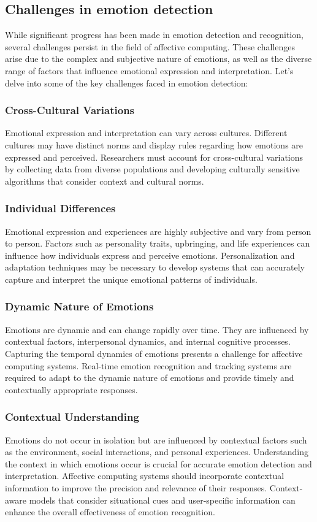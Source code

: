 \subsection{Challenges in emotion detection}
While significant progress has been made in emotion detection and recognition, several challenges persist in the field of affective computing.
These challenges arise due to the complex and subjective nature of emotions, as well as the diverse range of factors that influence emotional expression and interpretation. 
Let's delve into some of the key challenges faced in emotion detection:
\subsubsection{Cross-Cultural Variations}
Emotional expression and interpretation can vary across cultures. 
Different cultures may have distinct norms and display rules regarding how emotions are expressed and perceived. 
Researchers must account for cross-cultural variations by collecting data from diverse populations and developing culturally 
sensitive algorithms that consider context and cultural norms.
\subsubsection{Individual Differences}
Emotional expression and experiences are highly subjective and vary from person to person. 
Factors such as personality traits, upbringing, and life experiences can influence how individuals express and perceive emotions.
Personalization and adaptation techniques may be necessary to develop systems that can accurately capture and interpret the unique emotional patterns of individuals.
\subsubsection{Dynamic Nature of Emotions}
Emotions are dynamic and can change rapidly over time. They are influenced by contextual factors, interpersonal dynamics, and internal cognitive processes. Capturing the temporal dynamics of emotions presents a challenge for affective computing systems. 
Real-time emotion recognition and tracking systems are required to adapt to the dynamic nature of emotions and provide timely and contextually appropriate responses.
\subsubsection{Contextual Understanding}
Emotions do not occur in isolation but are influenced by contextual factors such as the environment, social interactions, and personal experiences. Understanding the context in which emotions occur is crucial for accurate emotion detection and interpretation. Affective computing systems should incorporate contextual information to improve the precision and relevance of their responses. 
Context-aware models that consider situational cues and user-specific information can enhance the overall effectiveness of emotion recognition.
